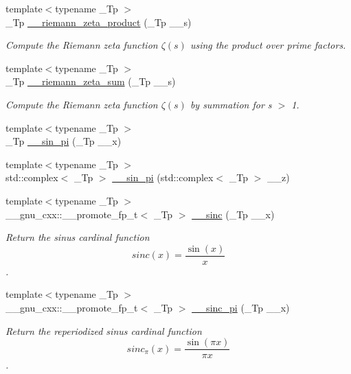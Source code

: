 \begin{DoxyCompactItemize}
{\footnotesize template$<$typename \+\_\+\+Tp $>$ }\\\+\_\+\+Tp \hyperlink{namespacestd_1_1____detail_a917935f42a21af90b78a19ea81349129}{\+\_\+\+\_\+riemann\+\_\+zeta\+\_\+product} (\+\_\+\+Tp \+\_\+\+\_\+s)
\begin{DoxyCompactList}\small\item\em Compute the Riemann zeta function $ \zeta(s) $ using the product over prime factors. \end{DoxyCompactList}\item 
{\footnotesize template$<$typename \+\_\+\+Tp $>$ }\\\+\_\+\+Tp \hyperlink{namespacestd_1_1____detail_a417dc216465f02bb7ef055fa0e4e1f0b}{\+\_\+\+\_\+riemann\+\_\+zeta\+\_\+sum} (\+\_\+\+Tp \+\_\+\+\_\+s)
\begin{DoxyCompactList}\small\item\em Compute the Riemann zeta function $ \zeta(s) $ by summation for s $>$ 1. \end{DoxyCompactList}\item 
{\footnotesize template$<$typename \+\_\+\+Tp $>$ }\\\+\_\+\+Tp \hyperlink{namespacestd_1_1____detail_a763249defff6377195818c2fc6e7bca2}{\+\_\+\+\_\+sin\+\_\+pi} (\+\_\+\+Tp \+\_\+\+\_\+x)
\item 
{\footnotesize template$<$typename \+\_\+\+Tp $>$ }\\std\+::complex$<$ \+\_\+\+Tp $>$ \hyperlink{namespacestd_1_1____detail_a5f26e85b3d646e5c69be173baebd4185}{\+\_\+\+\_\+sin\+\_\+pi} (std\+::complex$<$ \+\_\+\+Tp $>$ \+\_\+\+\_\+z)
\item 
{\footnotesize template$<$typename \+\_\+\+Tp $>$ }\\\+\_\+\+\_\+gnu\+\_\+cxx\+::\+\_\+\+\_\+promote\+\_\+fp\+\_\+t$<$ \+\_\+\+Tp $>$ \hyperlink{namespacestd_1_1____detail_aa7bdd4dd998288441b84ca2e142a4a04}{\+\_\+\+\_\+sinc} (\+\_\+\+Tp \+\_\+\+\_\+x)
\begin{DoxyCompactList}\small\item\em Return the sinus cardinal function \[ sinc(x) = \frac{\sin(x)}{x} \]. \end{DoxyCompactList}\item 
{\footnotesize template$<$typename \+\_\+\+Tp $>$ }\\\+\_\+\+\_\+gnu\+\_\+cxx\+::\+\_\+\+\_\+promote\+\_\+fp\+\_\+t$<$ \+\_\+\+Tp $>$ \hyperlink{namespacestd_1_1____detail_accfe65ec3790f60b0b429afbd4000bb1}{\+\_\+\+\_\+sinc\+\_\+pi} (\+\_\+\+Tp \+\_\+\+\_\+x)
\begin{DoxyCompactList}\small\item\em Return the reperiodized sinus cardinal function \[ sinc_\pi(x) = \frac{\sin(\pi x)}{\pi x} \]. \end{DoxyCompactList}\item 

\end{DoxyCompactItemize}
